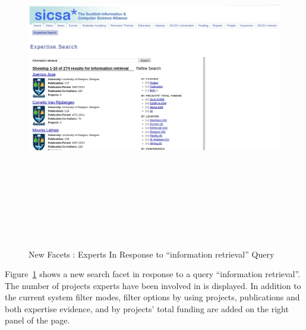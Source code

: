 \begin{figure}
 \centering
 \includegraphics[width=13cm,height=15cm,keepaspectratio]{./figures/newsearch.png}
 \caption{New Facets : Experts In Response to ``information retrieval'' Query} \label{fig:newsearch} 
 \end{figure}
 Figure~\ref{fig:newsearch} shows a new search facet in response to a query ``information retrieval''. The number of 
projects experts have been involved in is displayed. In addition to the current system filter modes, filter options by using projects, publications and both
expertise evidence, and by projects' total funding are added on the right panel of the page.

